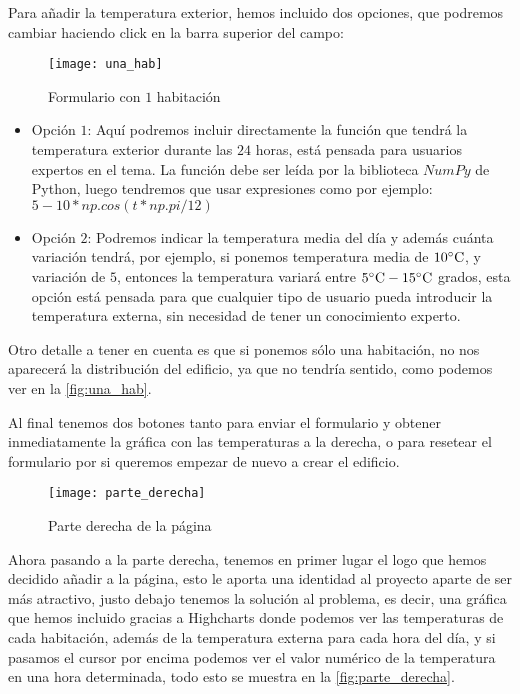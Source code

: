 Para añadir la temperatura exterior, hemos incluido dos opciones, que podremos cambiar haciendo click en la barra superior del campo:
\begin{figure}[h!]
	\centering
	\texttt{[image: una\_hab]}
	\caption{Formulario con $1$ habitación}
	\label{fig:una_hab}
\end{figure}
\begin{itemize}
	\item Opción $1$: Aquí podremos incluir directamente la función que tendrá la temperatura exterior durante las $24$ horas, está pensada para usuarios expertos en el tema. La función debe ser leída por la biblioteca $NumPy$ de Python, luego tendremos que usar expresiones como por ejemplo: $5 - 10*np.cos(t*np.pi/12)$
	\item Opción $2$: Podremos indicar la temperatura media del día y además cuánta variación tendrá, por ejemplo, si ponemos temperatura media de $10 \celsius$, y variación de $5$, entonces la temperatura variará entre $5 \celsius -15 \celsius$ grados, esta opción está pensada para que cualquier tipo de usuario pueda introducir la temperatura externa, sin necesidad de tener un conocimiento experto.
\end{itemize}

Otro detalle a tener en cuenta es que si ponemos sólo una habitación, no nos aparecerá la distribución del edificio, ya que no tendría sentido, como podemos ver en la \autoref{fig:una_hab}.

Al final tenemos dos botones tanto para enviar el formulario y obtener inmediatamente la gráfica con las temperaturas a la derecha, o para resetear el formulario por si queremos empezar de nuevo a crear el edificio.
\begin{figure}[h!]
	\centering
	\texttt{[image: parte\_derecha]}
	\caption{Parte derecha de la página}
	\label{fig:parte_derecha}
\end{figure}

Ahora pasando a la parte derecha, tenemos en primer lugar el logo que hemos decidido añadir a la página, esto le aporta una identidad al proyecto aparte de ser más atractivo, justo debajo tenemos la solución al problema, es decir, una gráfica que hemos incluido gracias a Highcharts donde podemos ver las temperaturas de cada habitación, además de la temperatura externa para cada hora del día, y si pasamos el cursor por encima podemos ver el valor numérico de la temperatura en una hora determinada, todo esto se muestra en la \autoref{fig:parte_derecha}.

